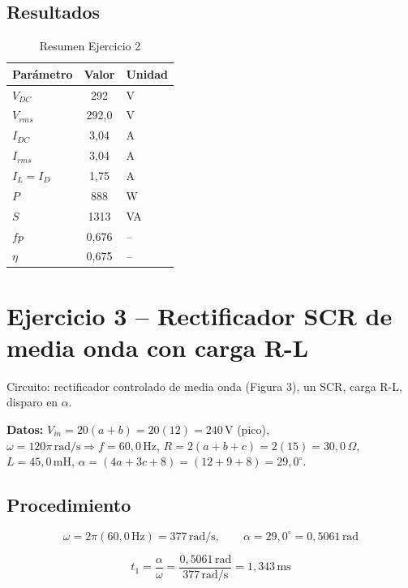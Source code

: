 \documentclass[12pt,a4paper]{article}
\begin{document}
\subsection{Resultados}

\begin{table}[H]
\centering
\begin{tabular}{lcl}
\toprule
\textbf{Parámetro} & \textbf{Valor} & \textbf{Unidad}\\
\midrule
$V_{DC}$ & 292 & V\\
$V_{rms}$ & 292{,}0 & V\\
$I_{DC}$ & 3{,}04 & A\\
$I_{rms}$ & 3{,}04 & A\\
$I_L=I_D$ & 1{,}75 & A\\
$P$ & 888 & W\\
$S$ & 1313 & VA\\
$fp$ & 0{,}676 & --\\
$\eta$ & 0{,}675 & --\\
\bottomrule
\end{tabular}
\caption{Resumen Ejercicio 2}
\end{table}

\newpage
\section{Ejercicio 3 -- Rectificador SCR de media onda con carga R-L}

Circuito: rectificador controlado de media onda (Figura 3), un SCR, carga R-L,
disparo en $\alpha$.

\textbf{Datos:} $V_{in}=20(a+b)=20(12)=240\,\text{V}$ (pico), $\omega=120\pi\,\text{rad/s}
\Rightarrow f=60{,}0\,\text{Hz}$, $R=2(a+b+c)=2(15)=30{,}0\,\Omega$, $L=45{,}0\,\text{mH}$,
$\alpha=(4a+3c+8)=(12+9+8)=29{,}0^\circ$.

\subsection{Procedimiento}

\begin{equation}
    \omega = 2\pi(60{,}0\,\text{Hz}) = 377\,\text{rad/s}, \qquad
    \alpha = 29{,}0^\circ = 0{,}5061\,\text{rad}
\end{equation}

\begin{equation}
    t_1 = \frac{\alpha}{\omega} = \frac{0{,}5061\,\text{rad}}{377\,\text{rad/s}} = \boxed{1{,}343\,\text{ms}}
\end{equation}
\end{document}

